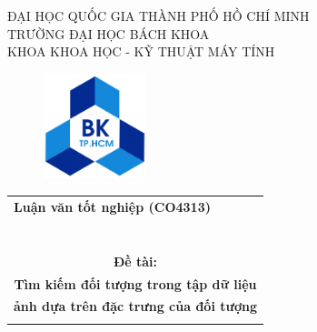 \documentclass[a4paper,14pt]{extreport}
\begin{document}
\begin{titlepage}
    \begin{center}
    ĐẠI HỌC QUỐC GIA THÀNH PHỐ HỒ CHÍ MINH \\
    TRƯỜNG ĐẠI HỌC BÁCH KHOA \\
    KHOA KHOA HỌC - KỸ THUẬT MÁY TÍNH 
    \end{center}

    \vspace{1cm}
    
    \begin{figure}[h!]
        \begin{center}
        \includegraphics[width=3cm]{img/hcmut.png}
        \end{center}
    \end{figure}
        
    \vspace{1cm}

    \begin{center}
        \begin{tabular}{c}
        \multicolumn{1}{l}{\textbf{{\Large Luận văn tốt nghiệp (CO4313)}}}\\
        ~~\\
        \\
        \hline
         \\
        \textbf{{\LARGE Đề tài:}} \\
		\textbf{{\LARGE Tìm kiếm đối tượng trong tập dữ liệu}}\\
		\textbf{{\LARGE ảnh dựa trên đặc trưng của đối tượng}}
		\\
		\\
        \hline
        \end{tabular}
    \end{center}

    \vspace{1.2cm}


\end{titlepage}
\end{document}
